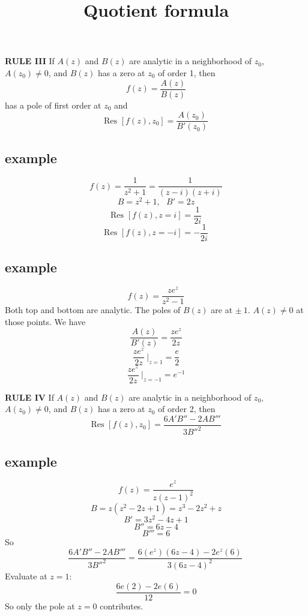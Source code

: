 \documentclass[11pt, oneside]{article}   	%
\title{Quotient formula}
\date{}							%
\begin{document}
\maketitle
\Large

\textbf{RULE III}  If $A(z)$ and $B(z)$ are analytic in a neighborhood of $z_0$, $A(z_0) \ne 0$, and $B(z)$ has a zero at $z_0$ of order 1, then
\[ f(z) = \frac{A(z)}{B(z)} \]
has a pole of first order at $z_0$ and
\[ \text{Res } [f(z),z_0] = \frac{A(z_0)}{B'(z_0)} \]
\subsection*{example}
\[ f(z) = \frac{1}{z^2 + 1} = \frac{1}{(z - i)(z + i)} \]
\[ B = z^2 + 1, \ \ \ B' = 2z \]
\[ \text{Res } [f(z),z=i] = \frac{1}{2i} \]
\[ \text{Res } [f(z),z=-i] = -\frac{1}{2i} \]

\subsection*{example}
\[ f(z) = \frac{z e^z}{z^2 - 1} \]
Both top and bottom are analytic.  The poles of $B(z)$ are at $\pm \ 1$.  $A(z) \ne 0$ at those points.  We have 
\[ \frac{A(z)}{B'(z)} = \frac{z e^z}{2z} \]
\[ \frac{z e^z}{2z} \ \bigg |_{z=1} = \frac{e}{2} \]
\[ \frac{z e^z}{2z} \ \bigg |_{z=-1} = e^{-1} \]

\textbf{RULE IV}  If $A(z)$ and $B(z)$ are analytic in a neighborhood of $z_0$, $A(z_0) \ne 0$, and $B(z)$ has a zero at $z_0$ of order 2, then
\[ \text{Res } [f(z),z_0] = \frac{6A' B'' - 2AB'''}{3B''^2} \]

\subsection*{example}
\[ f(z) = \frac{e^z}{z(z-1)^2} \]
\[ B = z(z^2 - 2z + 1) = z^3 - 2z^2 + z \]
\[ B' = 3z^2 - 4z + 1 \]
\[ B'' = 6z - 4 \]
\[ B''' = 6 \]
So
\[ \frac{6A' B'' - 2AB'''}{3B''^2} = \frac{6(e^z)(6z-4) - 2e^z(6)}{3(6z-4)^2} \ \]
Evaluate at $z=1$:
\[ \frac{6e(2) - 2e(6)}{12} = 0 \]
So only the pole at $z=0$ contributes.
\end{document}
